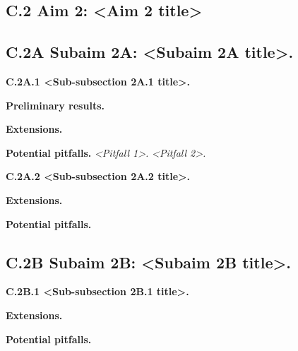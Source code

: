 
\subsection{C.2 Aim 2: <Aim 2 title>}\label{c.2-aim-2}

\lipsum[13]

\subsection{C.2A Subaim 2A: <Subaim 2A title>.}\label{c.2a}

\textbf{C.2A.1 <Sub-subsection 2A.1 title>.}\label{c.2a.1}
\lipsum[14]

\textbf{Preliminary results.}

\textbf{Extensions.}

\textbf{Potential pitfalls.}
\emph{<Pitfall 1>.} %
\emph{<Pitfall 2>.} %

\textbf{C.2A.2 <Sub-subsection 2A.2 title>.}

\textbf{Extensions.}

\textbf{Potential pitfalls.}

\subsection{C.2B Subaim 2B: <Subaim 2B title>.}\label{c.2b}
\lipsum[15]

\textbf{C.2B.1 <Sub-subsection 2B.1 title>.}

\textbf{Extensions.}

\textbf{Potential pitfalls.}
